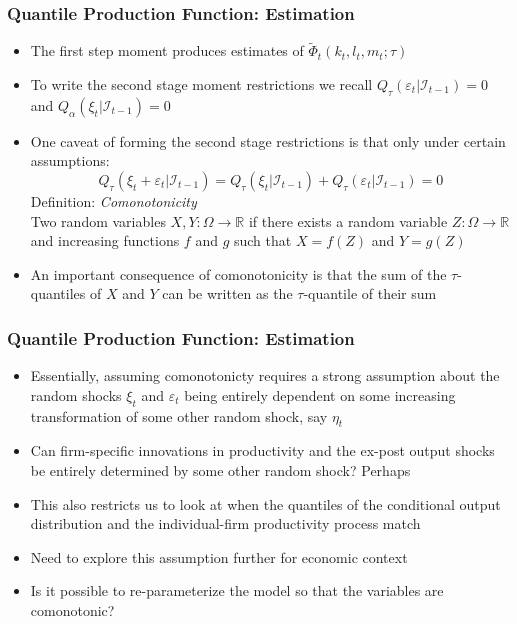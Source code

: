 \documentclass{beamer}
\begin{document}

\begin{frame}
\frametitle{Quantile Production Function: Estimation}
\begin{itemize}
		\item The first step moment produces estimates of $\tilde{\Phi}_{t}(k_{t}, l_{t}, m_{t}; \tau)$
		\item To write the second stage moment restrictions we recall $Q_{\tau}(\varepsilon_{t}|\mathcal{I}_{t-1})=0$ and $Q_{\alpha}(\xi_{t}|\mathcal{I}_{t-1})=0$
		\item One caveat of forming the second stage restrictions is that only under certain assumptions:
			\begin{equation}
				Q_{\tau}(\xi_{t} + \varepsilon_{t}|\mathcal{I}_{t-1})=Q_{\tau}(\xi_{t}|\mathcal{I}_{t-1})+Q_{\tau}(\varepsilon_{t}|\mathcal{I}_{t-1})=0
			\end{equation}
		Definition: \textit{Comonotonicity}\\
		\smallskip
		Two random variables $X,Y: \Omega \to \mathbb{R}$ if there exists a random variable $Z: \Omega \to \mathbb{R}$ and increasing functions $f$ and $g$ such that $X=f(Z)$ and $Y=g(Z)$
		\item An important consequence of comonotonicity is that the sum of the $\tau$-quantiles of $X$ and $Y$ can be written as the $\tau$-quantile of their sum 
\end{itemize}
\end{frame}


\begin{frame}
\frametitle{Quantile Production Function: Estimation}
\begin{itemize}
	\item Essentially, assuming comonotonicty requires a strong assumption about the random shocks $\xi_{t}$ and $\varepsilon_{t}$ being entirely dependent on some increasing transformation of some other random shock, say $\eta_{t}$
	\item Can firm-specific innovations in productivity and the ex-post output shocks be entirely determined by some other random shock? Perhaps
	\item This also restricts us to look at when the quantiles of the conditional output distribution and the individual-firm productivity process match
	\item Need to explore this assumption further for economic context
	\item Is it possible to re-parameterize the model so that the variables are comonotonic?
\end{itemize}
\end{frame}
\end{document}
